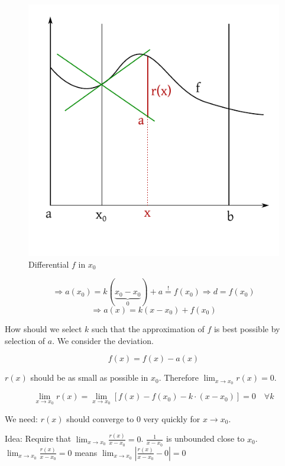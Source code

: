 \documentclass[a4paper,landscape,twocolumn]{article}
\theoremstyle{definition}
\newcommand\abs[1]{\left|#1\right|}
\begin{document}
\begin{figure}[!t]
  \begin{center}
    \includegraphics{img/differential.pdf}
    \caption{Differential $f$ in $x_0$}
    \label{img:differential}
  \end{center}
\end{figure}

\[ \Rightarrow a(x_0) = k (\underbrace{x_0 - x_0}_{0}) + a \overset!= f(x_0) \Rightarrow d = f(x_0) \]
\[ \Rightarrow a(x) = k (x - x_0) + f(x_0) \]

How should we select $k$ such that the approximation of $f$ is best possible by selection of $a$.
We consider the deviation.

\[ f(x) = f(x) - a(x) \]

$r(x)$ should be as small as possible in $x_0$.
Therefore $\lim_{x \to x_0} r(x) = 0$.

\[ \lim_{x \to x_0} r(x) = \lim_{x \to x_0} [f(x) - f(x_0) - k \cdot (x - x_0)] = 0 \quad\forall k \]

We need: $r(x)$ should converge to $0$ very quickly for $x \to x_0$.

Idea: Require that $\lim_{x \to x_0} \frac{r(x)}{x - x_0} = 0$.
$\frac1{x - x_0}$ is unbounded close to $x_0$. $\lim_{x \to x_0} \frac{r(x)}{x - x_0} = 0$ means
$\lim_{x \to x_0} \abs{\frac{r(x)}{x - x_0} - 0} = 0$
\end{document}
